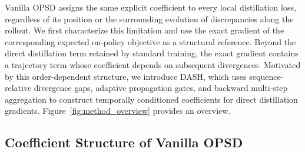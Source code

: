 \documentclass[letterpaper]{article} %
\begin{document}
Vanilla OPSD assigns the same explicit coefficient to every local
distillation loss, regardless of its position or the surrounding
evolution of discrepancies along the rollout. We first characterize
this limitation and use the exact gradient of the corresponding
expected on-policy objective as a structural reference. Beyond the
direct distillation term retained by standard training, the exact
gradient contains a trajectory term whose coefficient depends on
subsequent divergences. Motivated by this order-dependent structure,
we introduce DASH, which uses sequence-relative divergence gaps,
adaptive propagation gates, and backward multi-step aggregation to
construct temporally conditioned coefficients for direct distillation
gradients. Figure~\ref{fig:method_overview} provides an overview.

\subsection{Coefficient Structure of Vanilla OPSD}
\label{sec:order_analysis}
\end{document}
